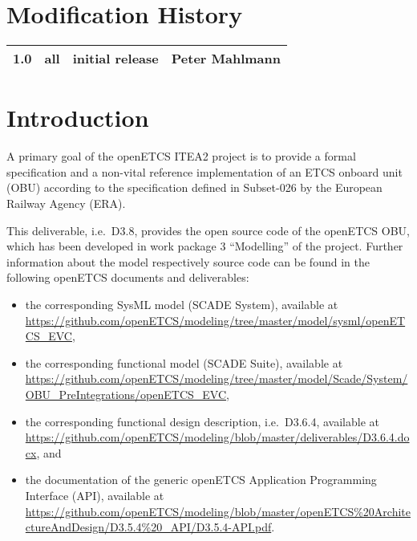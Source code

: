 \documentclass{template/openetcs_article}
\begin{document}


\section*{Modification History}
\begin{supertabular}{| m{1.2cm} | m{1.2cm} | m{6.6cm} | m{4cm} |}
 1.0 & all & initial release & Peter Mahlmann\\\hline
\end{supertabular}


\tableofcontents
\newpage















\section{Introduction}

A primary goal of the openETCS ITEA2 project is to provide a formal specification and a non-vital reference implementation of an ETCS onboard unit (OBU) according to the specification defined in Subset-026 by the European Railway Agency (ERA). 

This deliverable, i.e.~D3.8, provides the open source code of the openETCS OBU, which has been developed in work package 3 ``Modelling'' of the project. Further information about the model respectively source code can be found in the following openETCS documents and deliverables:
\begin{itemize}
\item the corresponding SysML model (SCADE System), available at \url{https://github.com/openETCS/modeling/tree/master/model/sysml/openETCS_EVC},
\item the corresponding functional model (SCADE Suite), available at \url{https://github.com/openETCS/modeling/tree/master/model/Scade/System/OBU_PreIntegrations/openETCS_EVC},
\item the corresponding functional design description, i.e.~D3.6.4, available at \url{https://github.com/openETCS/modeling/blob/master/deliverables/D3.6.4.docx}, and
\item the documentation of the generic openETCS Application Programming Interface (API), available at \url{https://github.com/openETCS/modeling/blob/master/openETCS%20ArchitectureAndDesign/D3.5.4%20_API/D3.5.4-API.pdf}.
\end{itemize}
\end{document}
